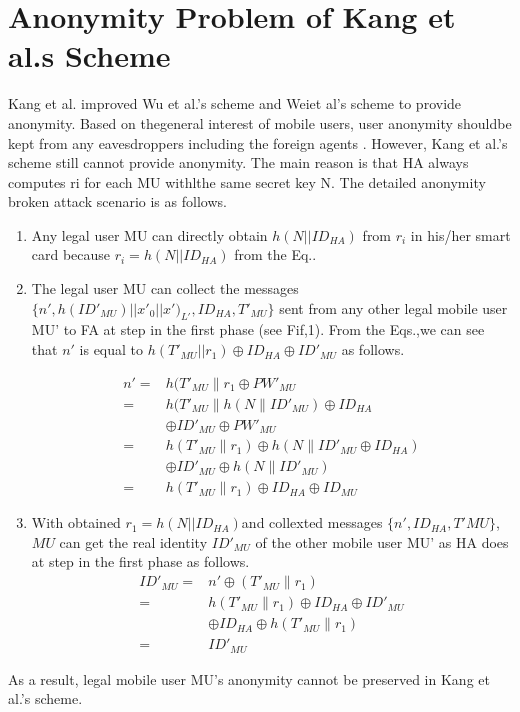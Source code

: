 \documentclass[UTF8]{ctexart}
\begin{document}
\section{Anonymity Problem of Kang et al.s Scheme}
Kang et al. \cite{ZYan122} improved Wu et al.'s scheme\cite{Lohr10} and Weiet al's scheme \cite{Ateniese11} to provide anonymity. Based on thegeneral interest of mobile users, user anonymity shouldbe kept from any eavesdroppers including the foreign agents \cite{Barsoum11}. However, Kang et al.'s scheme still cannot provide anonymity. The main reason is that HA always computes ri for each MU withlthe same secret key N. The detailed anonymity broken attack scenario is as follows.
\begin{enumerate}
  \item Any legal user MU can directly obtain $h(N||ID_{HA})$
from $r_{i}$ in his/her smart card because $r_{i} = h(N||ID_{HA})$
from the Eq.\cite{Zhang10}.
  \item The legal user MU can collect the messages $\{n',h(ID'_{MU})||x'_{0}||x')_{L'},ID_{HA},T'_{MU}\}$ sent from any other legal mobile user MU' to FA at step \cite{Li10} in the first phase (see Fif,1). From the Eqs.\cite{Li10,Zhang10,Lohr10,WangWRL10},we can see that $n'$ is equal to $h(T'_{MU}||r_{1})\oplus ID_{HA} \oplus ID'_{MU}$ as follows.

\begin{equation}
\begin{aligned}
n'=&h(T'_{MU}\|r_{1}\oplus PW'_{MU}\\
  =&h(T'_{MU}\|h(N\|ID'_{MU})\oplus ID_{HA}\\
   &  \oplus ID'_{MU}\oplus PW'_{MU} \\
  =&h(T'_{MU}\|r_{1})\oplus h(N\|ID'_{MU}\oplus ID_{HA})\\
   &  \oplus ID'_{MU}\oplus h(N\|ID'_{MU})\\
  =& h(T'_{MU}\|r_{1})\oplus ID_{HA}\oplus ID_{MU}
\end{aligned}
\end{equation}
  \item With obtained $r_{1} = h(N||ID_{HA}) $and collexted messages $\{n',ID_{HA},T'{MU}\}$, $MU$ can get the real identity $ID'_{MU}$ of the other mobile user MU' as HA does at step \cite{Lohr10} in the first phase as follows.
\begin{equation}
\begin{aligned}
ID'_{MU} =& n'\oplus(T'_{MU}\|r_{1})\\
         =& h(T'_{MU}\|r_{1})\oplus ID_{HA}\oplus ID'_{MU}\\
          & \oplus ID_{HA}\oplus h(T'_{MU}\|r_{1})\\
         =& ID'_{MU}
\end{aligned}
\end{equation}
\end{enumerate}
As a result, legal mobile user MU's anonymity cannot be preserved in Kang et al.'s scheme.
\end{document}
